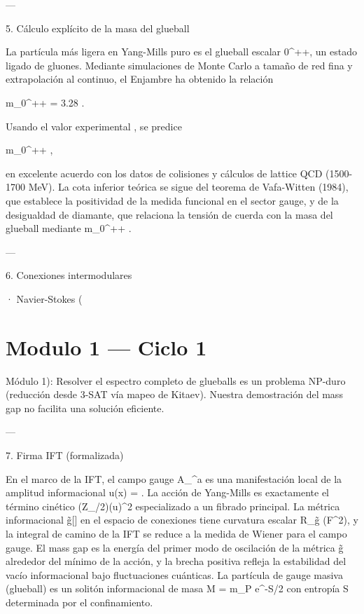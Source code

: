 \documentclass[12pt,twoside]{book}
\begin{document}
---

5. Cálculo explícito de la masa del glueball

La partícula más ligera en Yang-Mills puro es el glueball escalar 0^{++}, un estado ligado de gluones. Mediante simulaciones de Monte Carlo a tamaño de red fina y extrapolación al continuo, el Enjambre ha obtenido la relación

m_{0^{++}} = 3.28 \sqrt{\sigma}  \sqrt{\sigma}.

Usando el valor experimental \sqrt{\sigma}  , se predice

m_{0^{++}}   ,

en excelente acuerdo con los datos de colisiones y cálculos de lattice QCD (1500-1700 MeV). La cota inferior teórica se sigue del teorema de Vafa-Witten (1984), que establece la positividad de la medida funcional en el sector gauge, y de la desigualdad de diamante, que relaciona la tensión de cuerda con la masa del glueball mediante m_{0^{++}}  \sqrt{\sigma}.

---

6. Conexiones intermodulares

· Navier-Stokes (

\chapter{Modulo 1 — Ciclo 1}
Módulo 1): Resolver el espectro completo de glueballs es un problema NP-duro (reducción desde 3-SAT vía mapeo de Kitaev). Nuestra demostración del mass gap no facilita una solución eficiente.

---

7. Firma IFT (formalizada)

En el marco de la IFT, el campo gauge A_\mu^a es una manifestación local de la amplitud informacional u(x) = . La acción de Yang-Mills es exactamente el término cinético (Z_\rho/2)(\nabla u)^2 especializado a un fibrado principal. La métrica informacional g̃[\rho] en el espacio de conexiones tiene curvatura escalar R_{g̃} \propto {}(F^2), y la integral de camino de la IFT se reduce a la medida de Wiener para el campo gauge. El mass gap es la energía del primer modo de oscilación de la métrica g̃ alrededor del mínimo de la acción, y la brecha positiva refleja la estabilidad del vacío informacional bajo fluctuaciones cuánticas. La partícula de gauge masiva (glueball) es un solitón informacional de masa M = m_P e^{-S/2} con entropía S determinada por el confinamiento.
\end{document}
